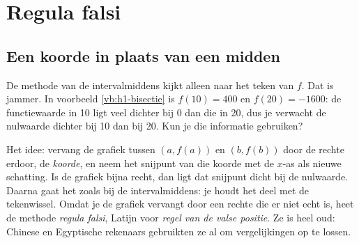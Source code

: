\section{Regula falsi}

\subsection{Een koorde in plaats van een midden}

De methode van de intervalmiddens kijkt alleen naar het teken van $f$. Dat is jammer. In voorbeeld \ref{vb:h1-bisectie} is $f(10) = 400$ en $f(20) = -1600$: de functiewaarde in 10 ligt veel dichter bij 0 dan die in 20, dus je verwacht de nulwaarde dichter bij 10 dan bij 20. Kun je die informatie gebruiken?

Het idee: vervang de grafiek tussen $(a, f(a))$ en $(b, f(b))$ door de rechte erdoor, de \textit{koorde}, en neem het snijpunt van die koorde met de $x$-as als nieuwe schatting. Is de grafiek bijna recht, dan ligt dat snijpunt dicht bij de nulwaarde. Daarna gaat het zoals bij de intervalmiddens: je houdt het deel met de tekenwissel. Omdat je de grafiek vervangt door een rechte die er niet echt is, heet de methode \textit{regula falsi}, Latijn voor \textit{regel van de valse positie}. Ze is heel oud: Chinese en Egyptische rekenaars gebruikten ze al om vergelijkingen op te lossen.

